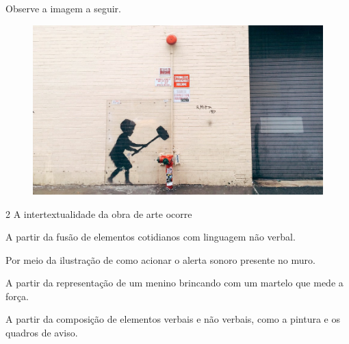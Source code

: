 

\pagebreak

Observe a imagem a seguir.

\begin{figure}[H]
\centering\includegraphics[width=\textwidth]{./imgSAEB_6_POR/media/image13.jpeg}
\end{figure}

\num{2} A intertextualidade da obra de arte ocorre

\begin{escolha}
\item A partir da fusão de elementos cotidianos com linguagem não verbal.
\item Por meio da ilustração de como acionar o alerta sonoro presente no
muro.
\item A partir da representação de um menino brincando com um martelo que
mede a força.
\item A partir da composição de elementos verbais e não verbais, como a
pintura e os quadros de aviso.
\end{escolha}


